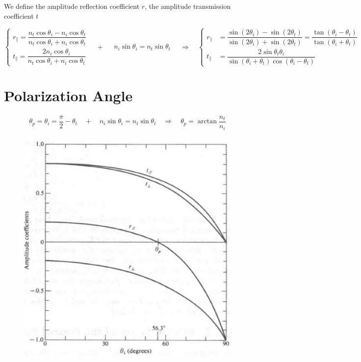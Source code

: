 We define the amplitude reflection coefficient $r$, the amplitude transmission coefficient $t$

\begin{equation*}
  \left\{
  \begin{aligned}
    r_{\parallel} = \dfrac{n_t \cos \theta_i - n_i \cos \theta_t}{n_t \cos \theta_i + n_i \cos \theta_t} \\
    t_{\parallel} = \dfrac{2 n_i \cos \theta_i}{n_t \cos \theta_i + n_i \cos \theta_t} 
  \end{aligned}
  \right.
  \quad + \quad
  \begin{aligned}
    n_i \sin \theta_i = n_t \sin \theta_t
  \end{aligned}
  \quad \Rightarrow \quad
  \left\{
  \begin{aligned}
    r_{\parallel} &= \dfrac{\sin \left( 2 \theta_i \right) - \sin \left( 2 \theta_t \right)}{\sin \left( 2 \theta_i \right) + \sin \left( 2 \theta_t \right)} = \dfrac{\tan \left( \theta_i - \theta_t \right)}{\tan \left( \theta_i + \theta_t \right)} \\
    t_{\parallel} &= \dfrac{2 \sin \theta_t \theta_i}{\sin \left( \theta_i + \theta_t \right) \cos \left( \theta_i - \theta_t \right)} 
  \end{aligned}
  \right.
\end{equation*}

\section{Polarization Angle}

\begin{equation*}
  \begin{aligned}
    \theta_p = \theta_i = \dfrac{\pi}{2} - \theta_t \quad + \quad  n_i \sin \theta_i = n_t \sin \theta_t \quad \Rightarrow \quad \theta_p = \arctan \dfrac{n_t}{n_i} 
  \end{aligned}
\end{equation*}

\begin{figure}[H]
  \centering
  \includegraphics[width=0.5\linewidth]{figures/Polarization-angle}
\end{figure}

